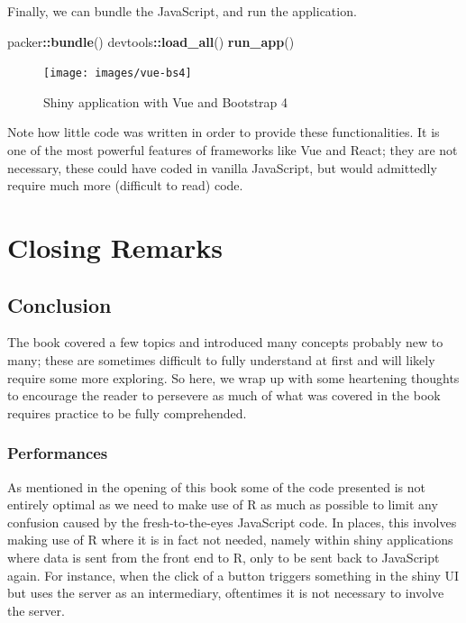 \documentclass[10pt,]{krantz}
\makeatletter
\newenvironment{Shaded}{\begin{snugshade}}{\end{snugshade}}
\newcommand{\KeywordTok}[1]{\textcolor[rgb]{0.27,0.27,0.27}{\textbf{#1}}}
\newcommand{\NormalTok}[1]{#1}
\newcommand{\OperatorTok}[1]{\textcolor[rgb]{0.43,0.43,0.43}{\textbf{#1}}}
\newenvironment{kframe}{%
\medskip{}
\setlength{\fboxsep}{.8em}
 \def\at@end@of@kframe{}%
 \ifinner\ifhmode%
  \def\at@end@of@kframe{\end{minipage}}%
  \begin{minipage}{\columnwidth}%
 \fi\fi%
 \def\FrameCommand##1{\hskip\@totalleftmargin \hskip-\fboxsep
 \colorbox{shadecolor}{##1}\hskip-\fboxsep
     \hskip-\linewidth \hskip-\@totalleftmargin \hskip\columnwidth}%
 \MakeFramed {\advance\hsize-\width
   \@totalleftmargin\z@ \linewidth\hsize
   \@setminipage}}%
 {\par\unskip\endMakeFramed%
 \at@end@of@kframe}
\renewenvironment{Shaded}{\begin{kframe}}{\end{kframe}}
\makeatother
\begin{document}
Finally, we can bundle the JavaScript, and run the application.

\begin{Shaded}
\begin{Highlighting}[]
\NormalTok{packer}\OperatorTok{::}\KeywordTok{bundle}\NormalTok{()}
\NormalTok{devtools}\OperatorTok{::}\KeywordTok{load_all}\NormalTok{()}
\KeywordTok{run_app}\NormalTok{()}
\end{Highlighting}
\end{Shaded}

\begin{figure}[H]

{\centering \texttt{[image: images/vue-bs4]} 

}

\caption{Shiny application with Vue and Bootstrap 4}\label{fig:vue-bs4}
\end{figure}

Note how little code was written in order to provide these functionalities. It is one of the most powerful features of frameworks like Vue and React; they are not necessary, these could have coded in vanilla JavaScript, but would admittedly require much more (difficult to read) code.

\hypertarget{part-closing-remarks}{%
\part{Closing Remarks}\label{part-closing-remarks}}

\hypertarget{conclusion}{%
\chapter{Conclusion}\label{conclusion}}

The book covered a few topics and introduced many concepts probably new to many; these are sometimes difficult to fully understand at first and will likely require some more exploring. So here, we wrap up with some heartening thoughts to encourage the reader to persevere as much of what was covered in the book requires practice to be fully comprehended.

\hypertarget{conclusion-performances}{%
\section{Performances}\label{conclusion-performances}}

As mentioned in the opening of this book some of the code presented is not entirely optimal as we need to make use of R as much as possible to limit any confusion caused by the fresh-to-the-eyes JavaScript code. In places, this involves making use of R where it is in fact not needed, namely within shiny applications where data is sent from the front end to R, only to be sent back to JavaScript again. For instance, when the click of a button triggers something in the shiny UI but uses the server as an intermediary, oftentimes it is not necessary to involve the server.
\end{document}
